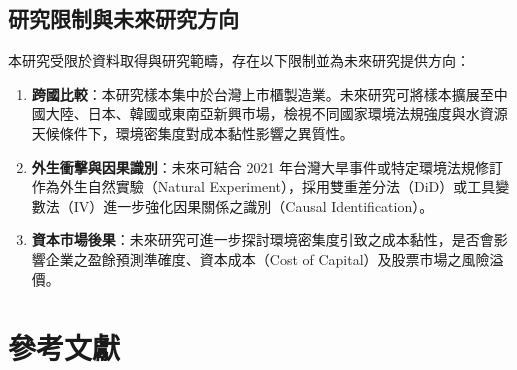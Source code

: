 \documentclass[12pt,a4paper]{article}
\begin{document}
\subsection{研究限制與未來研究方向}

本研究受限於資料取得與研究範疇，存在以下限制並為未來研究提供方向：
\begin{enumerate}[leftmargin=*]
    \item \textbf{跨國比較}：本研究樣本集中於台灣上市櫃製造業。未來研究可將樣本擴展至中國大陸、日本、韓國或東南亞新興市場，檢視不同國家環境法規強度與水資源天候條件下，環境密集度對成本黏性影響之異質性。
    \item \textbf{外生衝擊與因果識別}：未來可結合 2021 年台灣大旱事件或特定環境法規修訂作為外生自然實驗（Natural Experiment），採用雙重差分法（DiD）或工具變數法（IV）進一步強化因果關係之識別（Causal Identification）。
    \item \textbf{資本市場後果}：未來研究可進一步探討環境密集度引致之成本黏性，是否會影響企業之盈餘預測準確度、資本成本（Cost of Capital）及股票市場之風險溢價。
\end{enumerate}

\newpage

\section*{參考文獻}
\end{document}
